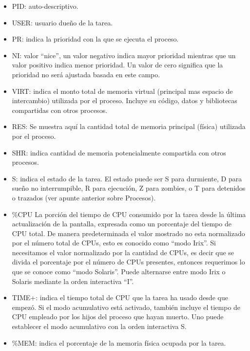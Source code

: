 \documentclass[12pt]{article}
\begin{document}
\begin{itemize}
\item PID: auto-descriptivo. 
\item USER: usuario dueño de la tarea.
\item PR: indica la prioridad con la que se ejecuta el proceso. 
\item NI: valor ``nice'', un valor negativo indica mayor prioridad mientras
que un valor positivo indica menor prioridad. Un valor de cero significa
que la prioridad no será ajustada basada en este campo. 
\item VIRT: indica el monto total de memoria virtual (principal mas espacio
de intercambio) utilizada por el proceso. Incluye su código, datos y 
bibliotecas compartidas con otros procesos.  
\item RES: Se muestra aquí la cantidad total de memoria principal (física)
 utilizada  por el proceso.  
\item SHR: indica cantidad  de  memoria potencialmente compartida con otros
procesos.
\item S: indica el estado  de  la tarea. El estado puede ser S para 
durmiente, D para sueño no interrumpible, R para ejecución, Z para zombies,
o  T para detenidos o trazados (ver apunte anterior sobre Procesos). 
\item \%CPU La  porción  del  tiempo  de  CPU  consumido por la tarea desde
la última actualización de la pantalla, expresada como un  porcentaje del 
tiempo de CPU total. De manera predeterminada el valor mostrado no esta
normalizado por el número total de CPUs, esto es conocido como 
``modo Irix''. Si necesitamos el valor normalizado por la cantidad de CPUs,
es decir que se divida el porcentaje por el número de CPUs presentes, 
entonces requerimos lo que se conoce como ``modo Solaris''. Puede alternarse
entre modo Irix o Solaris mediante la orden interactiva ``I''. 
\item TIME+: indica el tiempo total de CPU que la tarea ha usado desde que 
empezó. Si el  modo  acumulativo está activado, también incluye el tiempo
de  CPU empleado por los hijos del proceso que hayan muerto. Uno puede
establecer  el  modo  acumulativo  con la orden interactiva  S.  
\item \%MEM: indica el porcentaje de la memoria física ocupada por la tarea.
\end{itemize}

\end{document}
